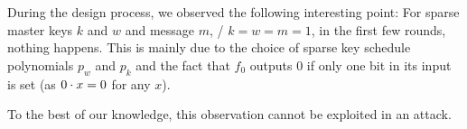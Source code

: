 During the design process, we observed the following interesting point:
For sparse master keys $k$ and $w$ and message $m$, \eg/ $k = w = m = 1$, in the first few rounds, nothing happens.
This is mainly due to the choice of sparse key schedule polynomials $p_w$ and $p_k$ and the fact that $f_0$ outputs $0$ if only one bit in its input is set (as $0 \cdot x = 0$ for any $x$).


To the best of our knowledge, this observation cannot be exploited in an attack.

